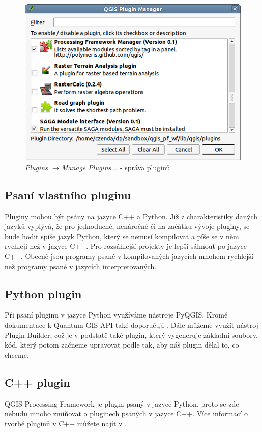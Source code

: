 \begin{figure}
	\centering
	\includegraphics[scale=0.5]{pictures/qgis_plugin/plugin_manager}
	\caption{\textit{Plugins $\rightarrow$Manage Plugins...} - správa pluginů}
  	\label{plugin_manager}
\end{figure}

\subsection{Psaní vlastního pluginu}
Pluginy mohou být psány na jazyce C++ a Python. Již z charakteristiky daných jazyků vyplývá, že pro jednoduché, nenáročné či na začátku vývoje pluginy, se bude hodit spíše jazyk Python, který se nemusí kompilovat a píše se v něm rychleji než v jazyce C++. Pro rozsáhlejší projekty je lepší sáhnout po jazyce C++. Obecně jsou programy psané v kompilovaných jazycích mnohem rychlejší než programy psané v jazycích interpretovaných. 

\subsection{Python plugin}
\nocite{pyqgis:www}
Při psaní pluginu v jazyce Python využíváme nástroje PyQGIS. Kromě dokumentace k Quantum GIS API také doporučuji \cite{pyqgis:www}. Dále můžeme využít nástroj Plugin Builder, což je v podstatě také plugin, který vygeneruje základní soubory, kód, který potom začneme upravovat podle tak, aby náš plugin dělal to, co chceme. \\

%

\subsection{C++ plugin}
QGIS Processing Framework je plugin psaný v jazyce Python, proto se zde nebudu mnoho zmiňovat o pluginech psaných v jazyce C++. Více informací o tvorbě pluginů v C++ můžete najít v  .
% 



